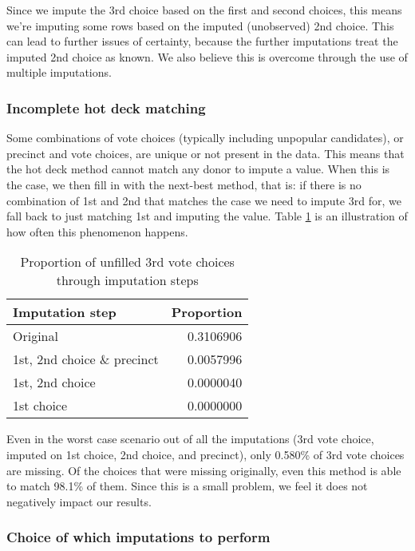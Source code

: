 \documentclass[12pt,twoside]{reedthesis}
\begin{document}
Since we impute the 3rd choice based on the first and second choices, this means we're imputing some rows based on the imputed (unobserved) 2nd choice. This can lead to further issues of certainty, because the further imputations treat the imputed 2nd choice as known. We also believe this is overcome through the use of multiple imputations.

\hypertarget{incomplete-hot-deck-matching}{%
\subsubsection{Incomplete hot deck matching}\label{incomplete-hot-deck-matching}}

Some combinations of vote choices (typically including unpopular candidates), or precinct and vote choices, are unique or not present in the data. This means that the hot deck method cannot match any donor to impute a value. When this is the case, we then fill in with the next-best method, that is: if there is no combination of 1st and 2nd that matches the case we need to impute 3rd for, we fall back to just matching 1st and imputing the value. Table \ref{tab:no-rhd-match} is an illustration of how often this phenomenon happens.
\begin{table}[t]

\caption[Imputation mismatches - 3rd choice]{\label{tab:no-rhd-match}Proportion of unfilled 3rd vote choices through imputation steps}
\centering
\begin{tabular}{lr}
\toprule
Imputation step & Proportion\\
\midrule
Original & 0.3106906\\
1st, 2nd choice \& precinct & 0.0057996\\
1st, 2nd choice & 0.0000040\\
1st choice & 0.0000000\\
\bottomrule
\end{tabular}
\end{table}
Even in the worst case scenario out of all the imputations (3rd vote choice, imputed on 1st choice, 2nd choice, and precinct), only 0.580\% of 3rd vote choices are missing. Of the choices that were missing originally, even this method is able to match 98.1\% of them. Since this is a small problem, we feel it does not negatively impact our results.

\hypertarget{choice-of-which-imputations-to-perform}{%
\subsubsection{Choice of which imputations to perform}\label{choice-of-which-imputations-to-perform}}
\end{document}
